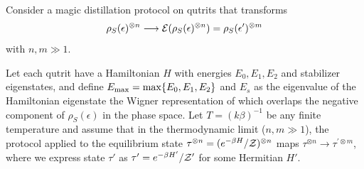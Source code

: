 \documentclass[pra,
aps,
twocolumn,
superscriptaddress,
groupedaddress,
nofootinbib,
reprint
]{revtex4-1}
\begin{document}
\begin{theorem}
	Consider a magic distillation protocol on qutrits that transforms
\begin{equation*}
	\rho_S(\epsilon)^{\otimes n} \longrightarrow {\mathcal E}(\rho_S(\epsilon)^{\otimes n})=\rho_S(\epsilon')^{\otimes m} 
\end{equation*}
with $n, m \gg 1$.

Let each qutrit have a Hamiltonian $H$ with energies $E_0, E_1, E_2$ and stabilizer eigenstates, and define $E_{\rm max} = \max\{E_0, E_1, E_2\}$ and $E_s$ as the eigenvalue of the Hamiltonian eigenstate the Wigner representation of which overlaps the negative component of $\rho_S(\epsilon)$ in the phase space. 
Let $T =(k\beta)^{-1}$ be any finite temperature and assume that in the thermodynamic limit ($n,m \gg 1$), the protocol applied to the equilibrium state $\tau^{\otimes n} = (e^{-\beta H}/\mathcal{Z})^{\otimes n}$ maps $\tau^{\otimes n} \longrightarrow \tau^{\prime \otimes m}$, where we express state $\tau'$ as $\tau' = e^{-\beta H'}/\mathcal{Z}'$ for some Hermitian $H'$.


\end{theorem}
\end{document}

